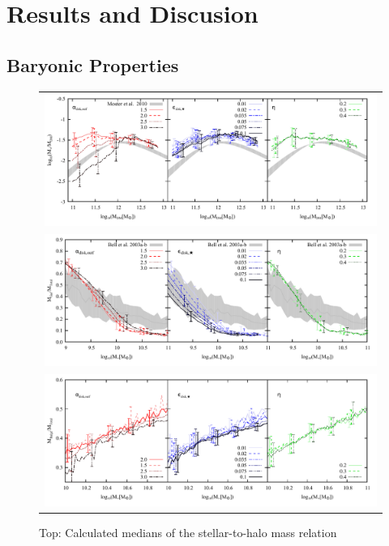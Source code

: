 \documentclass[usenatbib]{mn2e}
\begin{document}
\section{Results and Discusion}
\label{sec:results}



\subsection{Baryonic Properties}

\begin{figure}
\centering
\begin{tabular}{c}
\includegraphics{figures/runs/run-v1-13-multiplot-star-frac.pdf} \\
\includegraphics{figures/runs/run-v1-13-multiplot-gas-gfracscatter-quartils.pdf}\\
\includegraphics{figures/runs/run-v1-13-multiplot-bulge.pdf}
\end{tabular}
\caption{Top: Calculated medians of the stellar-to-halo mass relation
}
\end{figure}
\end{document}
